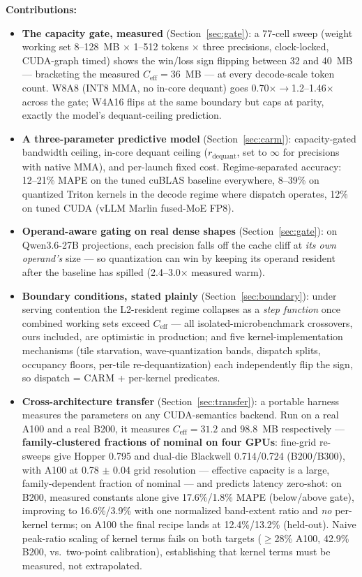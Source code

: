 \documentclass[10pt,twocolumn]{article}
\begin{document}
\textbf{Contributions:}
\begin{itemize}[leftmargin=*,topsep=0pt]
  \item \textbf{The capacity gate, measured} (Section~\ref{sec:gate}): a 77-cell sweep (weight working set 8--128~MB $\times$ 1--512 tokens $\times$ three precisions, clock-locked, CUDA-graph timed) shows the win/loss sign flipping between 32 and 40~MB --- bracketing the measured $C_\text{eff}=36$~MB --- at every decode-scale token count.  W8A8 (INT8 MMA, no in-core dequant) goes 0.70$\times\!\to$1.2--1.46$\times$ across the gate; W4A16 flips at the same boundary but caps at parity, exactly the model's dequant-ceiling prediction.
  \item \textbf{A three-parameter predictive model} (Section~\ref{sec:carm}): capacity-gated bandwidth ceiling, in-core dequant ceiling ($r_\text{dequant}$, set to $\infty$ for precisions with native MMA), and per-launch fixed cost.  Regime-separated accuracy: 12--21\% MAPE on the tuned cuBLAS baseline everywhere, 8--39\% on quantized Triton kernels in the decode regime where dispatch operates, 12\% on tuned CUDA (vLLM Marlin fused-MoE FP8).
  \item \textbf{Operand-aware gating on real dense shapes} (Section~\ref{sec:gate}): on Qwen3.6-27B projections, each precision falls off the cache cliff at \emph{its own operand's} size --- so quantization can win by keeping its operand resident after the baseline has spilled (2.4--3.0$\times$ measured warm).
  \item \textbf{Boundary conditions, stated plainly} (Section~\ref{sec:boundary}): under serving contention the L2-resident regime collapses as a \emph{step function} once combined working sets exceed $C_\text{eff}$ --- all isolated-microbenchmark crossovers, ours included, are optimistic in production; and five kernel-implementation mechanisms (tile starvation, wave-quantization bands, dispatch splits, occupancy floors, per-tile re-dequantization) each independently flip the sign, so dispatch = CARM + per-kernel predicates.
  \item \textbf{Cross-architecture transfer} (Section~\ref{sec:transfer}): a portable harness measures the parameters on any CUDA-semantics backend.  Run on a real A100 and a real B200, it measures $C_\text{eff}=31.2$ and $98.8$~MB respectively --- \textbf{family-clustered fractions of nominal on four GPUs}: fine-grid re-sweeps give Hopper 0.795 and dual-die Blackwell 0.714/0.724 (B200/B300), with A100 at 0.78 $\pm$ 0.04 grid resolution --- effective capacity is a large, family-dependent fraction of nominal --- and predicts latency zero-shot: on B200, measured constants alone give 17.6\%/1.8\% MAPE (below/above gate), improving to 16.6\%/3.9\% with one normalized band-extent ratio and \emph{no} per-kernel terms; on A100 the final recipe lands at 12.4\%/13.2\% (held-out).  Naive peak-ratio scaling of kernel terms fails on both targets ($\geq$28\% A100, 42.9\% B200, vs.\ two-point calibration), establishing that kernel terms must be measured, not extrapolated.

\end{itemize}
\end{document}
